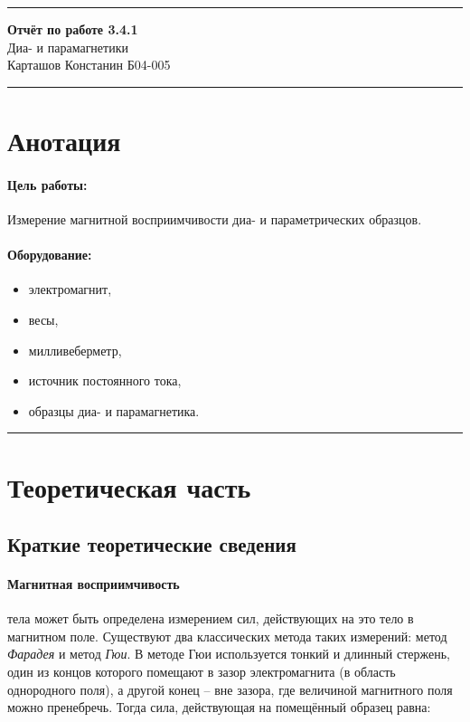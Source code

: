 \documentclass[a4paper,12pt]{article} %
\begin{document}


\hrule 	
\medskip
\begin{raggedright}
{\large \textbf{Отчёт по работе 3.4.1}}
\\
\medskip
{\Large Диа- и парамагнетики} 
\\
\medskip
{\large Карташов Констанин Б04-005}
\medskip
\hrule
\medskip
\end{raggedright}


\section{Анотация}

\paragraph{Цель работы:} 
Измерение магнитной восприимчивости диа- и параметрических образцов.

\paragraph{Оборудование:}
\begin{itemize}
\renewcommand{\labelitemi}{$\triangleright$}
\itemsep0em
\item электромагнит,
\item весы,
\item милливеберметр,
\item источник постоянного тока,
\item образцы диа- и парамагнетика.
\end{itemize}


\medskip\hrule\medskip

\section{Теоретическая часть}

\subsection{Краткие теоретические сведения}

\paragraph{Магнитная восприимчивость} тела может быть определена измерением сил, действующих на это тело в магнитном поле. Существуют два классических метода таких измерений: метод \textit{Фарадея }и метод \textit{Гюи}. В методе Гюи используется тонкий и длинный стержень, один из концов которого помещают в зазор электромагнита (в область однородного поля), а другой конец -- вне зазора, где величиной магнитного поля можно пренебречь. Тогда сила, действующая на помещённый образец равна:
\end{document}
